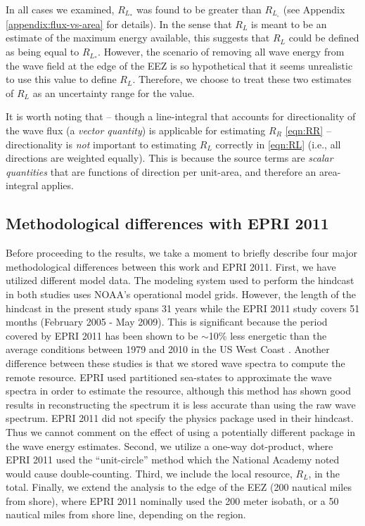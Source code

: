 In all cases we examined, $R_{L_*}$ was found to be greater than $R_{L_\circ}$ (see Appendix \ref{appendix:flux-vs-area} for details). In the sense that $R_L$ is meant to be an estimate of the maximum energy available, this suggests that $R_L$ could be defined as being equal to $R_{L_*}$. However, the scenario of removing all wave energy from the wave field at the edge of the EEZ is so hypothetical that it seems unrealistic to use this value to define $R_L$. Therefore, we choose to treat these two estimates of $R_L$ as an uncertainty range for the value.

It is worth noting that -- though a line-integral that accounts for directionality of the wave flux (a {\em vector quantity}) is applicable for estimating $R_R$ \eqref{eqn:RR} -- directionality is {\em not } important to estimating $R_L$ correctly in \eqref{eqn:RL} (i.e., all directions are weighted equally). This is because the source terms are {\em scalar quantities} that are functions of direction per unit-area, and therefore an area-integral applies.


\subsection{Methodological differences with EPRI 2011}
\label{sec:method:changes}

Before proceeding to the results, we take a moment to briefly describe four major methodological differences between this work and EPRI 2011. First, we have utilized  different model data. The modeling system used to perform the hindcast in both studies uses NOAA's operational model grids. However, the length of the hindcast in the present study spans 31 years while the EPRI 2011 study covers 51 months (February 2005 - May 2009). This is significant because the period covered by EPRI 2011 has been shown to be $\sim$10\% less energetic than the average conditions between 1979 and 2010 in the US West Coast \citep{yangCharacteristicsVariabilityNearshore2020}. Another difference between these studies is that we stored wave spectra to compute the remote resource. EPRI used partitioned sea-states to approximate the wave spectra in order to estimate the resource, although this method has shown good results in reconstructing the spectrum it is less accurate than using the raw wave spectrum. EPRI 2011 did not specify the physics package used in their hindcast. Thus we cannot comment on the effect of using a potentially different package in the wave energy estimates. Second, we utilize a one-way dot-product, where EPRI 2011 used the ``unit-circle'' method which the National Academy noted would cause double-counting. Third, we include the local resource, $R_L$, in the total. Finally, we extend the analysis to the edge of the EEZ (200 nautical miles from shore), where EPRI 2011 nominally used the 200 meter isobath, or a 50 nautical miles from shore line, depending on the region.


